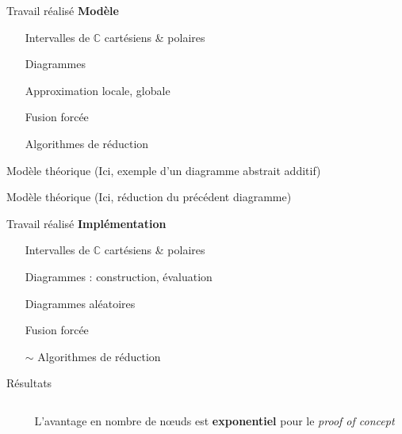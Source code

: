 \begin{frame}{Travail réalisé}
  \textbf{Modèle}
  \begin{itemize}
      \item[\checkmark] Intervalles de $\mathbb C$ cartésiens \& polaires
      \item[\checkmark] Diagrammes
      \item[\checkmark] Approximation locale, globale
      \item[\checkmark] Fusion forcée
      \item[\checkmark] Algorithmes de réduction
  \end{itemize}
\end{frame}

\begin{frame}{Modèle théorique}
  \Huge{(Ici, exemple d'un diagramme abstrait additif)}
\end{frame}

\begin{frame}{Modèle théorique}
  \Huge{(Ici, réduction du précédent diagramme)}
\end{frame}

\begin{frame}{Travail réalisé}
  \textbf{Implémentation}
  \begin{itemize}
      \item[\checkmark] Intervalles de $\mathbb C$ cartésiens \& polaires
      \item[\checkmark] Diagrammes : construction, évaluation
      \item[\checkmark] Diagrammes aléatoires
      \item[\checkmark] Fusion forcée
      \item[$\sim$] Algorithmes de réduction
  \end{itemize}
\end{frame}

\begin{frame}{Résultats}
  \begin{columns}
      \begin{column}{0.6\textwidth}
              \end{column}
      \begin{column}{0.4\textwidth}
          L'avantage en nombre de nœuds est \textbf{exponentiel} pour le \textit{proof of concept}
      \end{column}
  \end{columns}
\end{frame}
